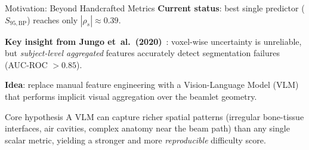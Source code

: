 \documentclass[aspectratio=169, 10pt]{beamer}
\begin{document}
\begin{frame}{Motivation: Beyond Handcrafted Metrics}
  \textbf{Current status}: best single predictor ($S_{95,\text{BP}}$)
  reaches only $|\rho_s| \approx 0.39$.

  \vspace{6pt}
  \textbf{Key insight from Jungo et~al.~(2020)}~\cite{jungo2020}:
  voxel-wise uncertainty is unreliable, but \emph{subject-level aggregated}
  features accurately detect segmentation failures (AUC-ROC $> 0.85$).

  \vspace{6pt}
  \textbf{Idea}: replace manual feature engineering with a
  Vision-Language Model (VLM) that performs implicit visual aggregation
  over the beamlet geometry.

  \vspace{8pt}
  \begin{block}{Core hypothesis}
    A VLM can capture richer spatial patterns (irregular bone-tissue
    interfaces, air cavities, complex anatomy near the beam path)
    than any single scalar metric, yielding a stronger and more
    \emph{reproducible} difficulty score.
  \end{block}
\end{frame}
\end{document}
